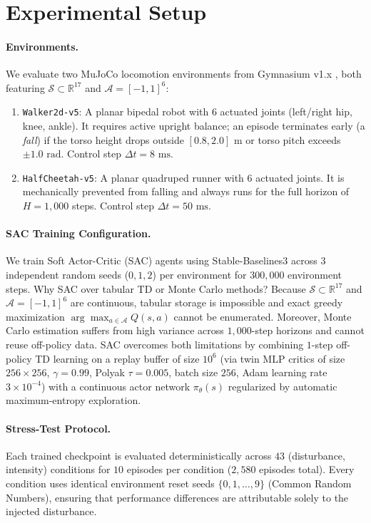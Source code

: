 \documentclass{article}
\begin{document}
\section{Experimental Setup}

\paragraph{Environments.}
We evaluate two MuJoCo locomotion environments from Gymnasium v1.x \citep{raffin2021stable}, both featuring $\mathcal{S} \subset \mathbb{R}^{17}$ and $\mathcal{A} = [-1, 1]^6$:
\begin{enumerate}
    \item \texttt{Walker2d-v5}: A planar bipedal robot with $6$ actuated joints (left/right hip, knee, ankle). It requires active upright balance; an episode terminates early (a \emph{fall}) if the torso height drops outside $[0.8, 2.0]\text{ m}$ or torso pitch exceeds $\pm 1.0\text{ rad}$. Control step $\Delta t = 8\text{ ms}$.
    \item \texttt{HalfCheetah-v5}: A planar quadruped runner with $6$ actuated joints. It is mechanically prevented from falling and always runs for the full horizon of $H = 1{,}000$ steps. Control step $\Delta t = 50\text{ ms}$.
\end{enumerate}

\paragraph{SAC Training Configuration.}
We train Soft Actor-Critic (SAC) agents using Stable-Baselines3 across $3$ independent random seeds ($0, 1, 2$) per environment for $300{,}000$ environment steps. Why SAC over tabular TD or Monte Carlo methods? Because $\mathcal{S} \subset \mathbb{R}^{17}$ and $\mathcal{A} = [-1, 1]^6$ are continuous, tabular storage is impossible and exact greedy maximization $\arg\max_{a \in \mathcal{A}} Q(s,a)$ cannot be enumerated. Moreover, Monte Carlo estimation suffers from high variance across $1{,}000$-step horizons and cannot reuse off-policy data. SAC overcomes both limitations by combining $1$-step off-policy TD learning on a replay buffer of size $10^6$ (via twin MLP critics of size $256 \times 256$, $\gamma=0.99$, Polyak $\tau=0.005$, batch size $256$, Adam learning rate $3 \times 10^{-4}$) with a continuous actor network $\pi_\theta(s)$ regularized by automatic maximum-entropy exploration.

\paragraph{Stress-Test Protocol.}
Each trained checkpoint is evaluated deterministically across $43$ (disturbance, intensity) conditions for $10$ episodes per condition ($2{,}580$ episodes total). Every condition uses identical environment reset seeds $\{0, 1, \dots, 9\}$ (Common Random Numbers), ensuring that performance differences are attributable solely to the injected disturbance.
\end{document}
